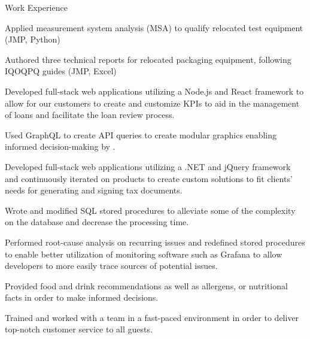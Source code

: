 \documentclass{resume} %
\begin{document}
\begin{workSection}{Work Experience}
    \experienceItem[
        company=Splunk,
        location=San Jose{,} CA,
        position=Backend Software Engineer Intern,
        duration=May 2023 – July 2023
    ]
     \begin{bullets}
        \item Applied measurement system analysis (MSA) to qualify relocated test equipment (JMP, Python)
        \item Authored three technical reports for relocated packaging equipment, following IQOQPQ guides (JMP, Excel)
     \end{bullets}
     
    \experienceItem[
        company=QwickRate,
        location=Marietta{,} GA (Remote),
        position=Software Engineer Intern,
        duration=August 2022 – April 2023
    ]
    \begin{bullets}
        \item Developed full-stack web applications utilizing a Node.js and React framework to allow for our customers to create and customize KPIs to aid in the management of loans and facilitate the loan review process.
        \item Used GraphQL to create API queries to create modular graphics enabling informed decision-making by .
     \end{bullets}

     \experienceItem[
        company=Ultimate Kronos Group (UKG),
        location=Atlanta{,} GA,
        position=Full-stack Software Engineer Intern,
        duration=January 2022 - August 2022,
     ]
     \begin{bullets}
        \item Developed full-stack web applications utilizing a .NET and jQuery framework and continuously iterated on products to create custom solutions to fit clients’ needs for generating and signing tax documents.
        \item Wrote and modified SQL stored procedures to alleviate some of the complexity on the database and decrease the processing time.
        \item Performed root-cause analysis on recurring issues and redefined stored procedures to enable better utilization of monitoring software such as Grafana to allow developers to more easily trace sources of potential issues.
     \end{bullets}

     \experienceItem[
        company=Longhorn Steakhouse,
        location=Marietta{,} GA,
        position=Server/Trainer,
        duration=February 2020 - December 2022,
     ]
     \begin{bullets}
        \item Provided food and drink recommendations as well as allergens, or nutritional facts in order to make informed decisions.
        \item Trained and worked with a team in a fast-paced environment in order to deliver top-notch customer service to all guests.
     \end{bullets}
     
\end{workSection}
\end{document}

